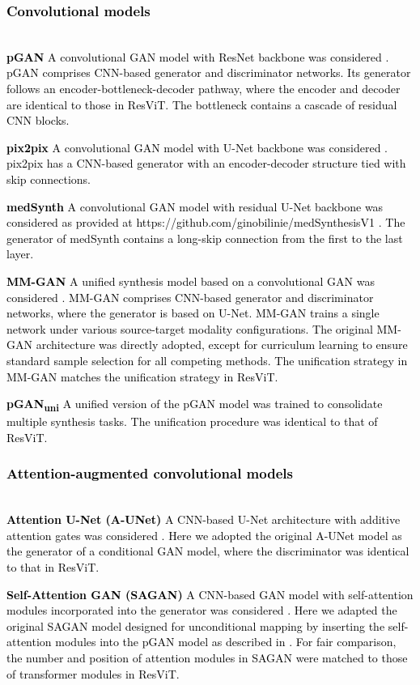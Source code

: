 \documentclass[journal,twoside,web]{ieeecolor}
\newcommand*{\revhl}{\textcolor{black}}
\begin{document}
\subsubsection{\revhl{Convolutional models}}
~\\ \revhl{\textbf{\quad pGAN} A convolutional GAN model with ResNet backbone was considered \cite{pgan}. pGAN comprises CNN-based generator and discriminator networks. Its generator follows an encoder-bottleneck-decoder pathway, where the encoder and decoder are identical to those in ResViT. The bottleneck contains a cascade of residual CNN blocks.} 


\revhl{\textbf{pix2pix} A convolutional GAN model with U-Net backbone was considered \cite{pix2pix}. pix2pix has a CNN-based generator with an encoder-decoder structure tied with skip connections.} 

\revhl{\textbf{medSynth} A convolutional GAN model with residual U-Net backbone was considered as provided at https://github.com/ginobilinie/medSynthesisV1 \cite{nie2018}. The generator of medSynth contains a long-skip connection from the first to the last layer.}

\revhl{\textbf{MM-GAN} A unified synthesis model based on a convolutional GAN was considered \cite{mmgan}. MM-GAN comprises CNN-based generator and discriminator networks, where the generator is based on U-Net. MM-GAN trains a single network under various source-target modality configurations. The original MM-GAN architecture was directly adopted, except for curriculum learning to ensure standard sample selection for all competing methods. The unification strategy in MM-GAN matches the unification strategy in ResViT.} 

\revhl{\textbf{pGAN\textsubscript{uni}} A unified version of the pGAN model was trained to consolidate multiple synthesis tasks. The unification procedure was identical to that of ResViT.}


\subsubsection{\revhl{Attention-augmented convolutional models}}
~\\ \revhl{\textbf{\quad Attention U-Net (A-UNet)}  A CNN-based U-Net architecture with additive attention gates was considered \cite{attention_unet}. Here we adopted the original A-UNet model as the generator of a conditional GAN model, where the discriminator was identical to that in ResViT. }

\revhl{\textbf{Self-Attention GAN (SAGAN)} A CNN-based GAN model with self-attention modules incorporated into the generator was considered \cite{sagan}. Here we adapted the original SAGAN model designed for unconditional mapping by inserting the self-attention modules into the pGAN model as described in \cite{scgan}. For fair comparison, the number and position of attention modules in SAGAN were matched to those of transformer modules in ResViT.}
\end{document}
